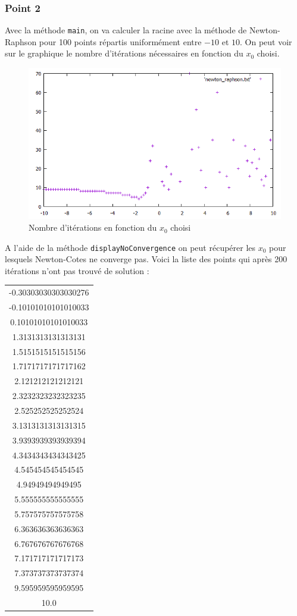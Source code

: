 \subsubsection{Point 2}

Avec la méthode \texttt{main}, on va calculer la racine avec la méthode de Newton-Raphson pour 100 points répartis uniformément entre $-10$ et $10$. On peut voir sur le graphique le nombre d'itérations nécessaires en fonction du $x_0$ choisi.

\begin{figure}[H]
	\caption{\label{11_newton_raphson} Nombre d'itérations en fonction du $x_0$ choisi}
	\centering
	\includegraphics[scale = 0.6]{Figures/11_newton_raphson.png}
\end{figure}

A l'aide de la méthode \texttt{displayNoConvergence} on peut récupérer les $x_0$ pour lesquels Newton-Cotes ne converge pas. Voici la liste des points qui après 200 itérations n'ont pas trouvé de solution :

\begin{table}[H]
\centering
\begin{tabular}{|c|}
\hline
-0.30303030303030276\\
-0.10101010101010033\\
0.10101010101010033\\
1.3131313131313131\\
1.5151515151515156\\
1.7171717171717162\\
2.121212121212121\\
2.3232323232323235\\
2.525252525252524\\
3.1313131313131315\\
3.9393939393939394\\
4.3434343434343425\\
4.545454545454545\\
4.94949494949495\\
5.555555555555555\\
5.757575757575758\\
6.363636363636363\\
6.767676767676768\\
7.171717171717173\\
7.373737373737374\\
9.595959595959595\\
10.0\\
\hline
\end{tabular}
\end{table}
